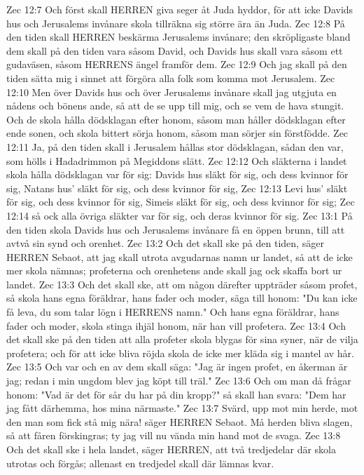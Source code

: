 Zec 12:7  Och först skall HERREN giva seger åt Juda hyddor, för att icke Davids hus och Jerusalems invånare skola tillräkna sig större ära än Juda.
Zec 12:8  På den tiden skall HERREN beskärma Jerusalems invånare; den skröpligaste bland dem skall på den tiden vara såsom David, och Davids hus skall vara såsom ett gudaväsen, såsom HERRENS ängel framför dem.
Zec 12:9  Och jag skall på den tiden sätta mig i sinnet att förgöra alla folk som komma mot Jerusalem.
Zec 12:10  Men över Davids hus och över Jerusalems invånare skall jag utgjuta en nådens och bönens ande, så att de se upp till mig, och se vem de hava stungit. Och de skola hålla dödsklagan efter honom, såsom man håller dödsklagan efter ende sonen, och skola bittert sörja honom, såsom man sörjer sin förstfödde.
Zec 12:11  Ja, på den tiden skall i Jerusalem hållas stor dödsklagan, sådan den var, som hölls i Hadadrimmon på Megiddons slätt.
Zec 12:12  Och släkterna i landet skola hålla dödsklagan var för sig: Davids hus släkt för sig, och dess kvinnor för sig, Natans hus' släkt för sig, och dess kvinnor för sig,
Zec 12:13  Levi hus' släkt för sig, och dess kvinnor för sig, Simeis släkt för sig, och dess kvinnor för sig;
Zec 12:14  så ock alla övriga släkter var för sig, och deras kvinnor för sig.
Zec 13:1  På den tiden skola Davids hus och Jerusalems invånare få en öppen brunn, till att avtvå sin synd och orenhet.
Zec 13:2  Och det skall ske på den tiden, säger HERREN Sebaot, att jag skall utrota avgudarnas namn ur landet, så att de icke mer skola nämnas; profeterna och orenhetens ande skall jag ock skaffa bort ur landet.
Zec 13:3  Och det skall ske, att om någon därefter uppträder såsom profet, så skola hans egna föräldrar, hans fader och moder, säga till honom: "Du kan icke få leva, du som talar lögn i HERRENS namn." Och hans egna föräldrar, hans fader och moder, skola stinga ihjäl honom, när han vill profetera.
Zec 13:4  Och det skall ske på den tiden att alla profeter skola blygas för sina syner, när de vilja profetera; och för att icke bliva röjda skola de icke mer kläda sig i mantel av hår.
Zec 13:5  Och var och en av dem skall säga: "Jag är ingen profet, en åkerman är jag; redan i min ungdom blev jag köpt till träl."
Zec 13:6  Och om man då frågar honom: "Vad är det för sår du har på din kropp?" så skall han svara: "Dem har jag fått därhemma, hos mina närmaste."
Zec 13:7  Svärd, upp mot min herde, mot den man som fick stå mig nära! säger HERREN Sebaot. Må herden bliva slagen, så att fåren förskingras; ty jag vill nu vända min hand mot de svaga.
Zec 13:8  Och det skall ske i hela landet, säger HERREN, att två tredjedelar där skola utrotas och förgås; allenast en tredjedel skall där lämnas kvar.
